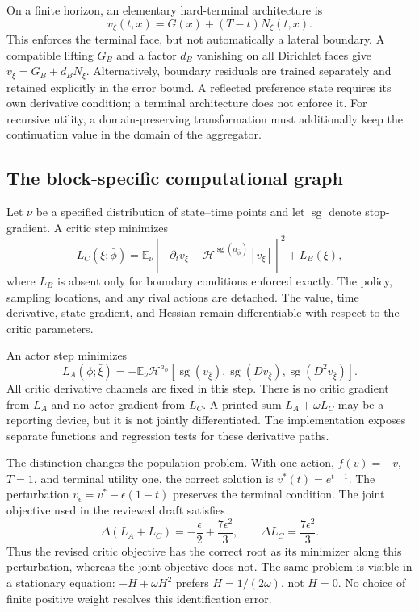 \documentclass[ecta,nameyear,draft]{econsocart}
\theoremstyle{definition}
\theoremstyle{remark}
\newcommand{\E}{\mathbb E}
\newcommand{\HH}{\mathcal H}
\newcommand{\sg}{\operatorname{sg}}
\begin{document}
On a finite horizon, an elementary hard-terminal architecture is
\begin{equation}\label{eq:terminal}
 v_\xi(t,x)=G(x)+(T-t)N_\xi(t,x).
\end{equation}
This enforces the terminal face, but not automatically a lateral boundary. A compatible lifting $G_B$ and a factor $d_B$ vanishing on all Dirichlet faces give $v_\xi=G_B+d_BN_\xi$. Alternatively, boundary residuals are trained separately and retained explicitly in the error bound. A reflected preference state requires its own derivative condition; a terminal architecture does not enforce it. For recursive utility, a domain-preserving transformation must additionally keep the continuation value in the domain of the aggregator.

\subsection{The block-specific computational graph}
Let $\nu$ be a specified distribution of state--time points and let $\sg$ denote stop-gradient. A critic step minimizes
\begin{equation}\label{eq:criticloss}
 L_C(\xi;\bar\phi)=\E_\nu\left[-\partial_t v_\xi-
                 \HH^{\sg(a_{\bar\phi})}[v_\xi]\right]^2+L_B(\xi),
\end{equation}
where $L_B$ is absent only for boundary conditions enforced exactly. The policy, sampling locations, and any rival actions are detached. The value, time derivative, state gradient, and Hessian remain differentiable with respect to the critic parameters.

An actor step minimizes
\begin{equation}\label{eq:actorloss}
 L_A(\phi;\bar\xi)=-\E_\nu\HH^{a_\phi}
 [\sg(v_{\bar\xi}),\sg(Dv_{\bar\xi}),\sg(D^2v_{\bar\xi})].
\end{equation}
All critic derivative channels are fixed in this step. There is no critic gradient from $L_A$ and no actor gradient from $L_C$. A printed sum $L_A+\omega L_C$ may be a reporting device, but it is not jointly differentiated. The implementation exposes separate functions and regression tests for these derivative paths.

The distinction changes the population problem. With one action, $f(v)=-v$, $T=1$, and terminal utility one, the correct solution is $v^*(t)=e^{t-1}$. The perturbation $v_\epsilon=v^*-\epsilon(1-t)$ preserves the terminal condition. The joint objective used in the reviewed draft satisfies
\begin{equation}\label{eq:counterexample}
 \Delta(L_A+L_C)=-\frac\epsilon2+\frac{7\epsilon^2}{3},
 \qquad \Delta L_C=\frac{7\epsilon^2}{3}.
\end{equation}
Thus the revised critic objective has the correct root as its minimizer along this perturbation, whereas the joint objective does not. The same problem is visible in a stationary equation: $-H+\omega H^2$ prefers $H=1/(2\omega)$, not $H=0$. No choice of finite positive weight resolves this identification error.
\end{document}
